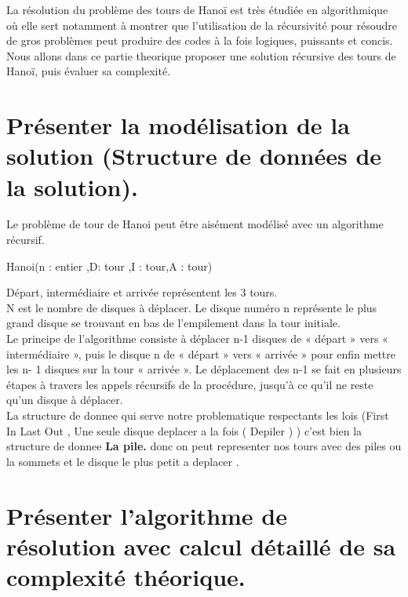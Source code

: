 La résolution du problème des tours de Hanoï est très étudiée en algorithmique où elle
sert notamment à montrer que l'utilisation de la récursivité pour résoudre de gros
problèmes peut produire des codes à la fois logiques, puissants et concis.
Nous allons dans ce partie theorique proposer une solution récursive des tours de Hanoï, puis évaluer sa complexité.
\section{Présenter la modélisation de la solution (Structure de données de la solution).}
Le problème de tour de Hanoi peut être aisément modélisé avec un algorithme récursif. 
\par
\begin{function}[H]
    \caption{Hanoi(n : entier ,D: tour ,I : tour,A : tour)}
    
\end{function}
\par
Départ, intermédiaire et arrivée représentent les 3 tours.\\
N est le nombre de disques à déplacer. Le disque numéro n représente le plus grand disque se trouvant en bas de l’empilement dans la tour initiale.\\
Le principe de l’algorithme consiste à déplacer n-1 disques de « départ » vers « intermédiaire », puis le disque n de « départ » vers « arrivée » pour enfin mettre les n- 1 disques sur la tour « arrivée ». Le déplacement des n-1 se fait en plusieurs étapes à travers les appels récursifs de la procédure, jusqu’à ce qu’il ne reste qu’un disque à déplacer.\\
La structure de donnee qui serve notre problematique respectants les lois (First In Last Out , Une seule disque deplacer a la fois ( Depiler ) ) c'est bien la structure de donnee \textbf{La pile.} donc on peut representer nos tours avec des piles ou la sommets et le disque le plus petit a deplacer . 
\section{Présenter l’algorithme de résolution avec calcul détaillé de sa complexité théorique.}
